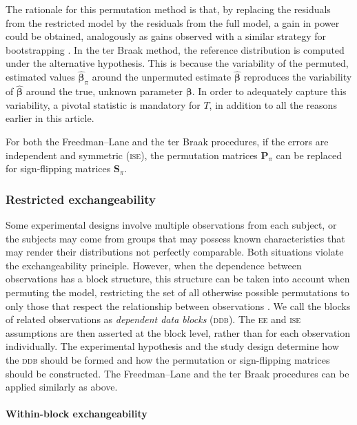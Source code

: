 The rationale for this permutation method is that, by replacing the residuals from the restricted model by the residuals from the full model, a gain in power could be obtained, analogously as gains observed with a similar strategy for bootstrapping \citep{Hall1989}. In the ter Braak method, the reference distribution is computed under the alternative hypothesis. This is because the variability of the permuted, estimated values $\boldsymbol{\hat{\beta}}_{\pi}$ around the unpermuted estimate $\boldsymbol{\hat{\beta}}$ reproduces the variability of $\boldsymbol{\hat{\beta}}$ around the true, unknown parameter $\boldsymbol{\beta}$. In order to adequately capture this variability, a pivotal statistic is mandatory for $T$, in addition to all the reasons earlier in this article.

For both the Freedman--Lane and the ter Braak procedures, if the errors are independent and symmetric (\textsc{ise}), the permutation matrices $\mathbf{P}_{\pi}$ can be replaced for sign-flipping matrices $\mathbf{S}_{\pi}$.

\subsubsection{Restricted exchangeability}

Some experimental designs involve multiple observations from each subject, or the subjects may come from groups that may possess known characteristics that may render their distributions not perfectly comparable. Both situations violate the exchangeability principle. However, when the dependence between observations has a block structure, this structure can be taken into account when permuting the model, restricting the set of all otherwise possible permutations to only those that respect the relationship between observations \citep{Pesarin2001}. We call the blocks of related observations as \emph{dependent data blocks} (\textsc{ddb}). The \textsc{ee} and \textsc{ise} assumptions are then asserted at the block level, rather than for each observation individually. The experimental hypothesis and the study design determine how the \textsc{ddb} should be formed and how the permutation or sign-flipping matrices should be constructed. The Freedman--Lane and the ter Braak procedures can be applied similarly as above.

\paragraph{Within-block exchangeability}

